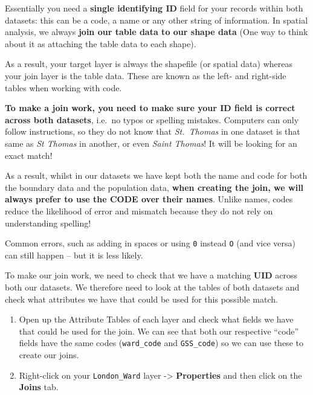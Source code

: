 \documentclass[
]{book}
\begin{document}
Essentially you need a \textbf{single identifying ID} field for your records within both datasets: this can be a code, a name or any other string of information. In spatial analysis, we always \textbf{join our table data to our shape data} (One way to think about it as attaching the table data to each shape).

As a result, your target layer is always the shapefile (or spatial data) whereas your join layer is the table data. These are known as the left- and right-side tables when working with code.

\textbf{To make a join work, you need to make sure your ID field is correct across both datasets}, i.e.~no typos or spelling mistakes. Computers can only follow instructions, so they do not know that \emph{St.~Thomas} in one dataset is that same as \emph{St Thomas} in another, or even \emph{Saint Thomas}! It will be looking for an exact match!

As a result, whilst in our datasets we have kept both the name and code for both the boundary data and the population data, \textbf{when creating the join, we will always prefer to use the CODE over their names}. Unlike names, codes reduce the likelihood of error and mismatch because they do not rely on understanding spelling!

Common errors, such as adding in spaces or using \texttt{0} instead \texttt{O} (and vice versa) can still happen -- but it is less likely.

To make our join work, we need to check that we have a matching \textbf{UID} across both our datasets. We therefore need to look at the tables of both datasets and check what attributes we have that could be used for this possible match.

\begin{enumerate}
\def\labelenumi{\arabic{enumi}.}
\setcounter{enumi}{3}
\item
  Open up the Attribute Tables of each layer and check what fields we have that could be used for the join. We can see that both our respective ``code'' fields have the same codes (\texttt{ward\_code} and \texttt{GSS\_code}) so we can use these to create our joins.
\item
  Right-click on your \texttt{London\_Ward} layer -\textgreater{} \textbf{Properties} and then click on the \textbf{Joins} tab.
\end{enumerate}
\end{document}
